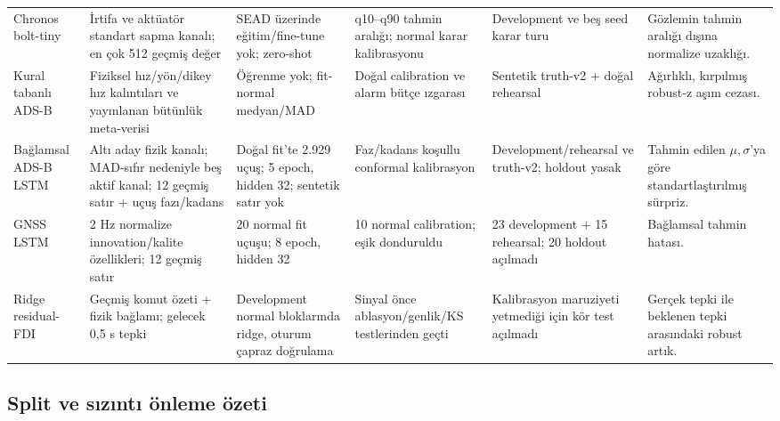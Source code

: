 \documentclass[10pt,a4paper]{article}
\begin{document}
\begin{landscape}
\begin{longtable}{p{2.6cm}p{4.5cm}p{3.5cm}p{3.3cm}p{3.3cm}p{3.8cm}}
Chronos bolt-tiny & İrtifa ve aktüatör standart sapma kanalı; en çok 512 geçmiş
değer & SEAD üzerinde eğitim/fine-tune yok; zero-shot & q10--q90 tahmin aralığı;
normal karar kalibrasyonu & Development ve beş seed karar turu & Gözlemin tahmin
aralığı dışına normalize uzaklığı. \\

Kural tabanlı ADS-B & Fiziksel hız/yön/dikey hız kalıntıları ve yayınlanan
bütünlük meta-verisi & Öğrenme yok; fit-normal medyan/MAD & Doğal calibration
ve alarm bütçe ızgarası & Sentetik truth-v2 + doğal rehearsal & Ağırlıklı,
kırpılmış robust-z aşım cezası. \\

Bağlamsal ADS-B LSTM & Altı aday fizik kanalı; MAD-sıfır nedeniyle beş aktif
kanal; 12 geçmiş satır + uçuş fazı/kadans & Doğal fit'te 2.929 uçuş; 5 epoch,
hidden 32; sentetik satır yok & Faz/kadans koşullu conformal kalibrasyon &
Development/rehearsal ve truth-v2; holdout yasak & Tahmin edilen $\mu,\sigma$'ya
göre standartlaştırılmış sürpriz. \\

GNSS LSTM & 2 Hz normalize innovation/kalite özellikleri; 12 geçmiş satır &
20 normal fit uçuşu; 8 epoch, hidden 32 & 10 normal calibration; eşik donduruldu &
23 development + 15 rehearsal; 20 holdout açılmadı & Bağlamsal tahmin hatası. \\

Ridge residual-FDI & Geçmiş komut özeti + fizik bağlamı; gelecek 0,5 s tepki &
Development normal bloklarında ridge, oturum çapraz doğrulama & Sinyal önce
ablasyon/genlik/KS testlerinden geçti & Kalibrasyon maruziyeti yetmediği için
kör test açılmadı & Gerçek tepki ile beklenen tepki arasındaki robust artık. \\
\bottomrule
\end{longtable}
\end{landscape}

\subsection{Split ve sızıntı önleme özeti}
\end{document}

